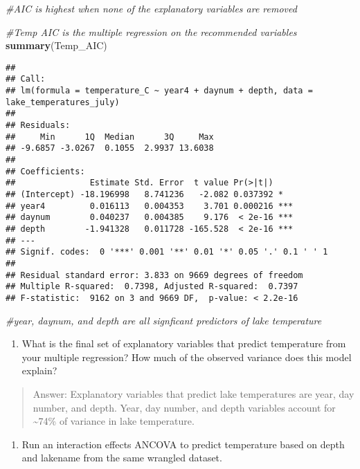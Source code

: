 \documentclass[]{article}
\newenvironment{Shaded}{\begin{snugshade}}{\end{snugshade}}
\newcommand{\CommentTok}[1]{\textcolor[rgb]{0.56,0.35,0.01}{\textit{#1}}}
\newcommand{\KeywordTok}[1]{\textcolor[rgb]{0.13,0.29,0.53}{\textbf{#1}}}
\newcommand{\NormalTok}[1]{#1}
\providecommand{\tightlist}{%
  \setlength{\itemsep}{0pt}\setlength{\parskip}{0pt}}
\begin{document}
\begin{Shaded}
\begin{Highlighting}[]
\CommentTok{#AIC is highest when none of the explanatory variables are removed}

\CommentTok{#Temp AIC is the multiple regression on the recommended variables}
\KeywordTok{summary}\NormalTok{(Temp_AIC)}
\end{Highlighting}
\end{Shaded}

\begin{verbatim}
## 
## Call:
## lm(formula = temperature_C ~ year4 + daynum + depth, data = lake_temperatures_july)
## 
## Residuals:
##     Min      1Q  Median      3Q     Max 
## -9.6857 -3.0267  0.1055  2.9937 13.6038 
## 
## Coefficients:
##               Estimate Std. Error  t value Pr(>|t|)    
## (Intercept) -18.196998   8.741236   -2.082 0.037392 *  
## year4         0.016113   0.004353    3.701 0.000216 ***
## daynum        0.040237   0.004385    9.176  < 2e-16 ***
## depth        -1.941328   0.011728 -165.528  < 2e-16 ***
## ---
## Signif. codes:  0 '***' 0.001 '**' 0.01 '*' 0.05 '.' 0.1 ' ' 1
## 
## Residual standard error: 3.833 on 9669 degrees of freedom
## Multiple R-squared:  0.7398, Adjusted R-squared:  0.7397 
## F-statistic:  9162 on 3 and 9669 DF,  p-value: < 2.2e-16
\end{verbatim}

\begin{Shaded}
\begin{Highlighting}[]
\CommentTok{#year, daynum, and depth are all signficant predictors of lake temperature}
\end{Highlighting}
\end{Shaded}

\begin{enumerate}
\def\labelenumi{\arabic{enumi}.}
\setcounter{enumi}{4}
\tightlist
\item
  What is the final set of explanatory variables that predict
  temperature from your multiple regression? How much of the observed
  variance does this model explain?
\end{enumerate}

\begin{quote}
Answer: Explanatory variables that predict lake temperatures are year,
day number, and depth. Year, day number, and depth variables account for
\textasciitilde{}74\% of variance in lake temperature.
\end{quote}

\begin{enumerate}
\def\labelenumi{\arabic{enumi}.}
\setcounter{enumi}{5}
\tightlist
\item
  Run an interaction effects ANCOVA to predict temperature based on
  depth and lakename from the same wrangled dataset.
\end{enumerate}
\end{document}
